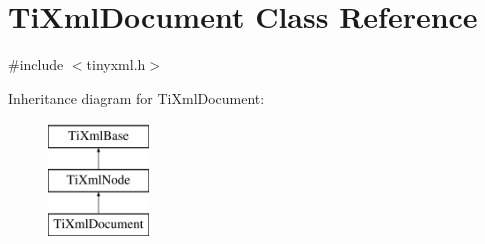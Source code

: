 \hypertarget{classTiXmlDocument}{\section{\-Ti\-Xml\-Document \-Class \-Reference}
\label{classTiXmlDocument}
}


{\ttfamily \#include $<$tinyxml.\-h$>$}

\-Inheritance diagram for \-Ti\-Xml\-Document\-:\begin{figure}[H]
\begin{center}
\leavevmode
\includegraphics[height=3.000000cm]{classTiXmlDocument}
\end{center}
\end{figure}
